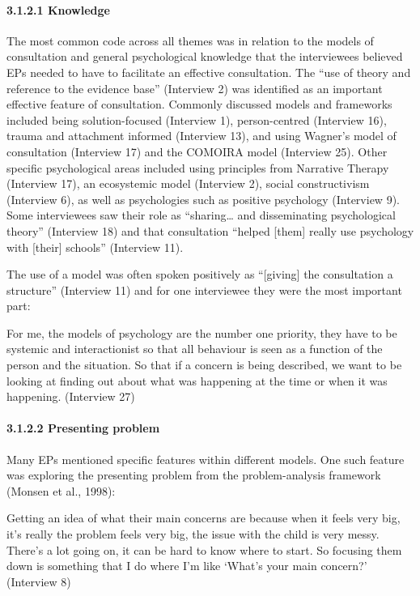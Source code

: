 \documentclass[
]{article}
\begin{document}
\hypertarget{knowledge}{%
\paragraph{3.1.2.1 Knowledge}\label{knowledge}}

The most common code across all themes was in relation to the models of
consultation and general psychological knowledge that the interviewees
believed EPs needed to have to facilitate an effective consultation. The
``use of theory and reference to the evidence base'' (Interview 2) was
identified as an important effective feature of consultation. Commonly
discussed models and frameworks included being solution-focused
(Interview 1), person-centred (Interview 16), trauma and attachment
informed (Interview 13), and using Wagner's model of consultation
(Interview 17) and the COMOIRA model (Interview 25). Other specific
psychological areas included using principles from Narrative Therapy
(Interview 17), an ecosystemic model (Interview 2), social
constructivism (Interview 6), as well as psychologies such as positive
psychology (Interview 9). Some interviewees saw their role as
``sharing\ldots{} and disseminating psychological theory'' (Interview
18) and that consultation ``helped {[}them{]} really use psychology with
{[}their{]} schools'' (Interview 11).

The use of a model was often spoken positively as ``{[}giving{]} the
consultation a structure'' (Interview 11) and for one interviewee they
were the most important part:

For me, the models of psychology are the number one priority, they have
to be systemic and interactionist so that all behaviour is seen as a
function of the person and the situation. So that if a concern is being
described, we want to be looking at finding out about what was happening
at the time or when it was happening. (Interview 27)

\hypertarget{presenting-problem}{%
\paragraph{3.1.2.2 Presenting problem}\label{presenting-problem}}

Many EPs mentioned specific features within different models. One such
feature was exploring the presenting problem from the problem-analysis
framework (Monsen et al., 1998):

Getting an idea of what their main concerns are because when it feels
very big, it's really the problem feels very big, the issue with the
child is very messy. There's a lot going on, it can be hard to know
where to start. So focusing them down is something that I do where I'm
like `What's your main concern?' (Interview 8)
\end{document}
